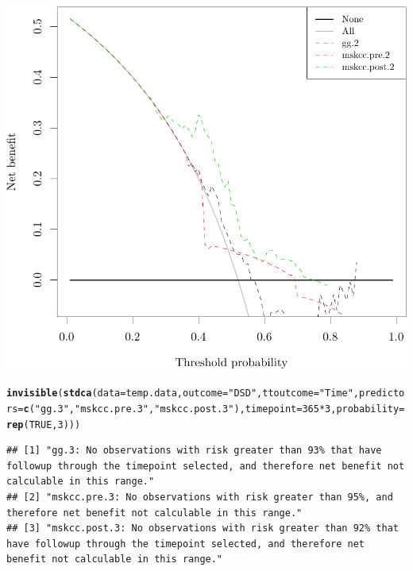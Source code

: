 \documentclass{article}\usepackage[]{graphicx}\usepackage[]{color}
\makeatletter
\def\maxwidth{ %
  \ifdim\Gin@nat@width>\linewidth
    \linewidth
  \else
    \Gin@nat@width
  \fi
}
\newcommand{\hlnum}[1]{\textcolor[rgb]{0.686,0.059,0.569}{#1}}%
\newcommand{\hlstr}[1]{\textcolor[rgb]{0.192,0.494,0.8}{#1}}%
\newcommand{\hlopt}[1]{\textcolor[rgb]{0,0,0}{#1}}%
\newcommand{\hlstd}[1]{\textcolor[rgb]{0.345,0.345,0.345}{#1}}%
\newcommand{\hlkwc}[1]{\textcolor[rgb]{0.333,0.667,0.333}{#1}}%
\newcommand{\hlkwd}[1]{\textcolor[rgb]{0.737,0.353,0.396}{\textbf{#1}}}%
\newenvironment{kframe}{%
 \def\at@end@of@kframe{}%
 \ifinner\ifhmode%
  \def\at@end@of@kframe{\end{minipage}}%
  \begin{minipage}{\columnwidth}%
 \fi\fi%
 \def\FrameCommand##1{\hskip\@totalleftmargin \hskip-\fboxsep
 \colorbox{shadecolor}{##1}\hskip-\fboxsep
     \hskip-\linewidth \hskip-\@totalleftmargin \hskip\columnwidth}%
 \MakeFramed {\advance\hsize-\width
   \@totalleftmargin\z@ \linewidth\hsize
   \@setminipage}}%
 {\par\unskip\endMakeFramed%
 \at@end@of@kframe}
\newenvironment{knitrout}{}{} %
\makeatother
\begin{document}
\begin{knitrout}
{\centering \includegraphics[width=\maxwidth]{figure/07-model-selection-dca-5} 

}


\begin{kframe}\begin{alltt}
\hlkwd{invisible}\hlstd{(}\hlkwd{stdca}\hlstd{(}\hlkwc{data} \hlstd{= temp.data,} \hlkwc{outcome} \hlstd{=} \hlstr{"DSD"}\hlstd{,} \hlkwc{ttoutcome} \hlstd{=} \hlstr{"Time"}\hlstd{,} \hlkwc{predictors} \hlstd{=} \hlkwd{c}\hlstd{(}\hlstr{"gg.3"}\hlstd{,} \hlstr{"mskcc.pre.3"}\hlstd{,} \hlstr{"mskcc.post.3"}\hlstd{),} \hlkwc{timepoint} \hlstd{=} \hlnum{365}\hlopt{*}\hlnum{3}\hlstd{,} \hlkwc{probability} \hlstd{=} \hlkwd{rep}\hlstd{(}\hlnum{TRUE}\hlstd{,} \hlnum{3}\hlstd{)))}
\end{alltt}
\begin{verbatim}
## [1] "gg.3: No observations with risk greater than 93% that have followup through the timepoint selected, and therefore net benefit not calculable in this range."        
## [2] "mskcc.pre.3: No observations with risk greater than 95%, and therefore net benefit not calculable in this range."                                                   
## [3] "mskcc.post.3: No observations with risk greater than 92% that have followup through the timepoint selected, and therefore net benefit not calculable in this range."
\end{verbatim}
\end{kframe}


\end{knitrout}
\end{document}
